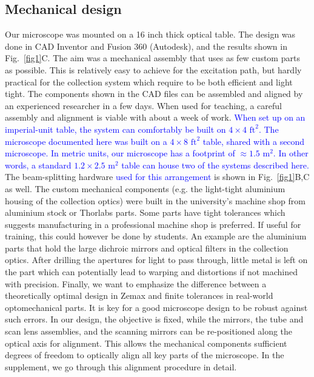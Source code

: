 \documentclass[10pt,letterpaper]{article}
\begin{document}
\subsection*{Mechanical design}
Our microscope was mounted on a 16 inch thick optical table. The design was done in CAD Inventor and Fusion 360 (Autodesk), and the results shown in Fig.~\ref{fig1}C. The aim was a mechanical assembly that uses as few custom parts as possible. This is relatively easy to achieve for the excitation path, but hardly practical for the collection system which require to be both efficient and light tight. The components shown in the CAD files can be assembled and aligned by an experienced researcher in a few days. When used for teaching, a careful assembly and alignment is viable with about a week of work. \textcolor{blue}{When set up on an imperial-unit table, the system can comfortably be built on $4\times4 \text{ ft}^2$. The microscope documented here was built on a $4\times8\text{ ft}^2$ table, shared with a second microscope. In metric units, our microscope has a footprint of $\approx 1.5\text{ m}^2$. In other words, a standard $1.2\times2.5\text{ m}^2$ table can house two of the systems described here.} The beam-splitting hardware \textcolor{blue}{used for this arrangement} is shown in Fig.~\ref{fig1}B,C as well.\newline
The custom mechanical components (e.g. the light-tight aluminium housing of the collection optics) were built in the university's machine shop from aluminium stock or Thorlabs parts. Some parts have tight tolerances which suggests manufacturing in a professional machine shop is preferred. If useful for training, this could however be done by students. An example are the aluminium parts that hold the large dichroic mirrors and optical filters in the collection optics. After drilling the apertures for light to pass through, little metal is left on the part which can potentially lead to warping and distortions if not machined with precision.\newline
Finally, we want to emphasize the difference between a theoretically optimal design in Zemax and finite tolerances in real-world optomechanical parts. It is key for a good microscope design to be robust against such errors. In our design, the objective is fixed, while the mirrors, the tube and scan lens assemblies, and the scanning mirrors can be re-positioned along the optical axis for alignment. This allows the mechanical components sufficient degrees of freedom to optically align all key parts of the microscope. In the supplement, we go through this alignment procedure in detail.
\end{document}
